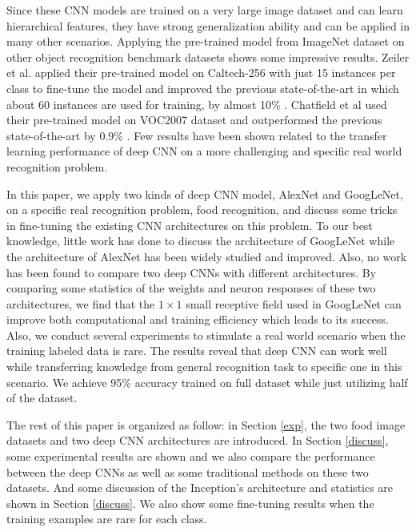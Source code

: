 Since these CNN models are trained on a very large image dataset and can learn hierarchical features, they have strong generalization ability and can be applied in many other scenarios. Applying the pre-trained model from ImageNet dataset on other object recognition benchmark datasets shows some impressive results.
Zeiler et al. applied their pre-trained model on Caltech-256 with just 15 instances per class to fine-tune the model and improved the previous state-of-the-art in which about 60 instances are used for training, by almost 10\% \cite{zeiler2014visualizing}.
Chatfield et al used their pre-trained model on VOC2007 dataset and outperformed the previous state-of-the-art by 0.9\% \cite{Chatfield14}.
Few results have been shown related to the transfer learning performance of deep CNN on a more challenging and specific real world recognition problem.

In this paper, we apply two kinds of deep CNN model, AlexNet and GoogLeNet, on a specific real recognition problem, food recognition, and discuss some tricks in fine-tuning the existing CNN architectures on this problem. To our best knowledge, little work has done to discuss the architecture of GoogLeNet while the architecture of AlexNet has been widely studied and improved. Also, no work has been found to compare two deep CNNs with different architectures. By comparing some statistics of the weights and neuron responses of these two architectures, we find that the $1\times 1$ small receptive field used in GoogLeNet can improve both computational and training efficiency which leads to its success.
Also, we conduct several experiments to stimulate a real world scenario when the training labeled data is rare. The results reveal that deep CNN can work well while transferring knowledge from general recognition task to specific one in this scenario. We achieve 95\% accuracy trained on full dataset while just utilizing half of the dataset.

The rest of this paper is organized as follow: in Section \ref{exp}, the two food image datasets and two deep CNN architectures are introduced. In Section \ref{discuss}, some experimental results are shown and we also compare the performance between the deep CNNs as well as some traditional methods on these two datasets. And some discussion of the Inception's architecture and statistics are shown in Section \ref{discuss}. We also show some fine-tuning results when the training examples are rare for each class.
